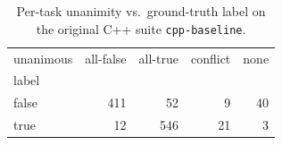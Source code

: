 \begin{table}[t]
  \centering
  \caption{Per-task unanimity vs.\ ground-truth label on the original C++ suite \texttt{cpp-baseline}.}
  \label{tab:unanimous-cpp-baseline}
\begin{tabular}{lrrrr}
\toprule
unanimous & all-false & all-true & conflict & none \\
label &  &  &  &  \\
\midrule
false & 411 & 52 & 9 & 40 \\
true & 12 & 546 & 21 & 3 \\
\bottomrule
\end{tabular}
\end{table}
